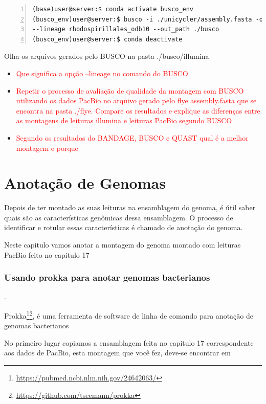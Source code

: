 \documentclass[letter,11pt]{book}
\begin{document}
\begin{Verbatim}[commandchars=!\{\}, numbers=left,label= BUSCO para dados Illumina,frame=topline,fontsize=\scriptsize]
(base)user@server:$ conda activate busco_env
(busco_env)user@server:$ busco -i ./unicycler/assembly.fasta -o illumina -m geno \
--lineage rhodospirillales_odb10 --out_path ./busco
(busco_env)user@server:$ conda deactivate
\end{Verbatim}

Olha os arquivos gerados pelo BUSCO na pasta ./busco/illumina

\begin{itemize}
\item \textcolor{red}{Que significa a opção --lineage no comando do BUSCO}
\item \textcolor{red}{Repetir o processo de avaliação de qualidade da montagem com BUSCO utilizando os dados PacBio no arquivo gerado pelo flye assembly.fasta que se encontra na pasta ./flye. Compare os resultados e explique as diferenças entre as montagens de leituras illumina e leituras PacBio segundo BUSCO}
\item \textcolor{red}{Segundo os resultados do BANDAGE, BUSCO e QUAST qual é a melhor montagem e porque}
\end{itemize}

\chapter{Anotação de Genomas}

Depois de ter montado as suas leituras na ensamblagem do genoma, é útil saber quais são as características genômicas dessa ensamblagem. O processo de identificar e rotular essas características é chamado de anotação do genoma.

Neste capitulo vamos anotar a montagem do genoma montado com leituras PacBio feito no capitulo 17

\subsection{Usando prokka para anotar genomas bacterianos}.

Prokka\footnote{\url{https://pubmed.ncbi.nlm.nih.gov/24642063/}}\footnote{\url{https://github.com/tseemann/prokka}}, é uma ferramenta de software de linha de comando para anotação de genomas bacterianos

No primeiro lugar copiamos a ensamblagem feita no capitulo 17 correspondente aos dados de PacBio, esta montagem que você fez, deve-se encontrar em
\end{document}
